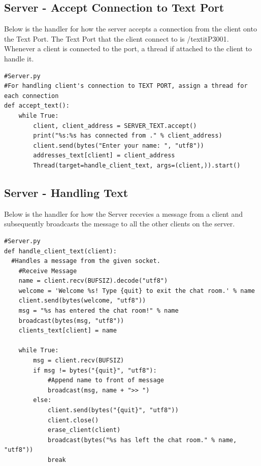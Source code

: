 \documentclass[a4paper,11pt]{article}
\begin{document}
\subsection{Server - Accept Connection to Text Port}
Below is the handler for how the server accepts a connection from the client onto the Text Port. The Text Port that the client connect to is /textit{P3001}. Whenever a client is connected to the port, a thread if attached to the client to handle it.
\begin{mdframed}[backgroundcolor=light-gray, roundcorner=30pt,leftmargin=1, rightmargin=1, innerleftmargin=5, innertopmargin=-3,innerbottommargin=5, outerlinewidth=1, linecolor=light-gray]
\begin{lstlisting}
#Server.py
#For handling client's connection to TEXT PORT, assign a thread for each connection
def accept_text():
	while True:
		client, client_address = SERVER_TEXT.accept()
		print("%s:%s has connected from ." % client_address)
		client.send(bytes("Enter your name: ", "utf8"))
		addresses_text[client] = client_address
		Thread(target=handle_client_text, args=(client,)).start()

\end{lstlisting}
\end{mdframed}

\subsection{Server - Handling Text}
Below is the handler for how the Server recevies a message from a client and subsequently broadcasts the message to all the other clients on the server.
\begin{mdframed}[backgroundcolor=light-gray, roundcorner=30pt,leftmargin=1, rightmargin=1, innerleftmargin=5, innertopmargin=-3,innerbottommargin=5, outerlinewidth=1, linecolor=light-gray]
\begin{lstlisting}
#Server.py
def handle_client_text(client):
  #Handles a message from the given socket.
	#Receive Message
	name = client.recv(BUFSIZ).decode("utf8")
	welcome = 'Welcome %s! Type {quit} to exit the chat room.' % name
	client.send(bytes(welcome, "utf8"))
	msg = "%s has entered the chat room!" % name
	broadcast(bytes(msg, "utf8"))
	clients_text[client] = name

	while True:
		msg = client.recv(BUFSIZ)
		if msg != bytes("{quit}", "utf8"):
			#Append name to front of message
			broadcast(msg, name + ">> ")
		else:
			client.send(bytes("{quit}", "utf8"))
			client.close()
			erase_client(client)
			broadcast(bytes("%s has left the chat room." % name, "utf8"))
			break

\end{lstlisting}
\end{mdframed}
\end{document}
